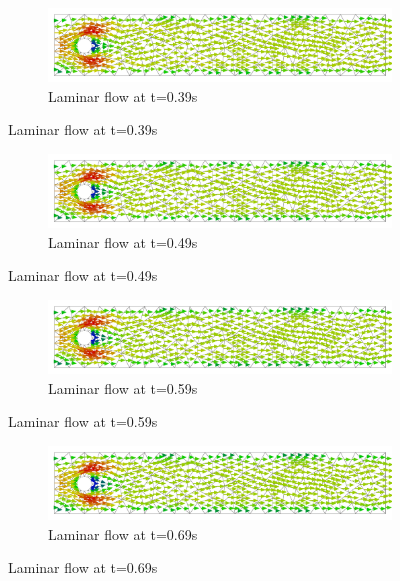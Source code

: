 \begin{figure}[H]
	\ContinuedFloat
	\begin{subfigure}{\textwidth}
    \includegraphics[width=\textwidth]{Figures/numerical_results/laminar_gpu/laminar_velocity_field_39.svg.pdf}
    \caption{Laminar flow at t=0.39s}
        \end{subfigure}
\end{figure}

\begin{figure}[H]
	\ContinuedFloat
	\begin{subfigure}{\textwidth}
    \includegraphics[width=\textwidth]{Figures/numerical_results/laminar_gpu/laminar_velocity_field_49.svg.pdf}
    \caption{Laminar flow at t=0.49s}
        \end{subfigure}
\end{figure}

\begin{figure}[H]
	\ContinuedFloat
	\begin{subfigure}{\textwidth}
    \includegraphics[width=\textwidth]{Figures/numerical_results/laminar_gpu/laminar_velocity_field_59.svg.pdf}
    \caption{Laminar flow at t=0.59s}
        \end{subfigure}
\end{figure}

\begin{figure}[H]
	\ContinuedFloat
	\begin{subfigure}{\textwidth}
    \includegraphics[width=\textwidth]{Figures/numerical_results/laminar_gpu/laminar_velocity_field_69.svg.pdf}
    \caption{Laminar flow at t=0.69s}
        \end{subfigure}
\end{figure}

